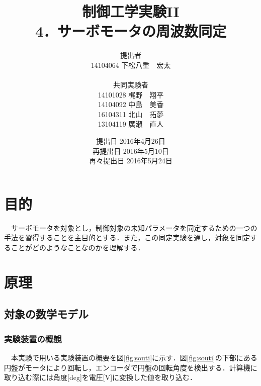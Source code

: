 \documentclass{jsarticle}
\begin{document}
\title{制御工学実験II \\ 4．サーボモータの周波数同定}
\author{提出者 \\ 14104064 下松八重　宏太 \\ \\ 共同実験者 \\ 14101028 梶野　翔平 \\ 14104092 中島　美香 \\ 16104311 北山　拓夢 \\ 13104119 廣瀬　直人}
\date{提出日 2016年4月26日 \\ 再提出日 2016年5月10日 \\ 再々提出日 2016年5月24日}



\maketitle
\thispagestyle{empty}
\newpage

 \section{目的}
 　サーボモータを対象とし，制御対象の未知パラメータを同定するための一つの手法を習得することを主目的とする．また，この同定実験を通し，対象を同定することがどのようなことなのかを理解する．
 
 \section{原理}
  \subsection{対象の数学モデル}
   \subsubsection{実験装置の概観}
   　本実験で用いる実験装置の概要を図\ref{fig:souti}に示す．図\ref{fig:souti}の下部にある円盤がモータにより回転し，エンコーダで円盤の回転角度を検出する．計算機に取り込む際には角度[deg]を電圧[V]に変換した値を取り込む．
\end{document}
